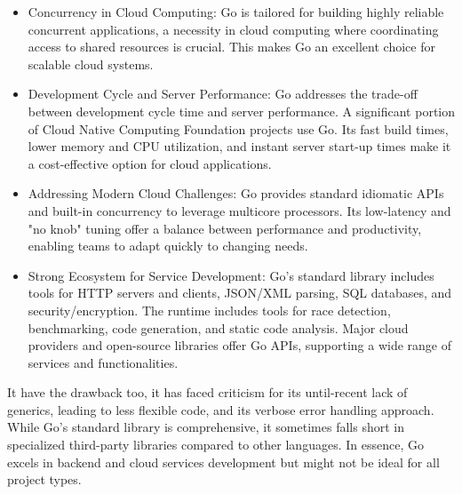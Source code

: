 \begin{itemize}
    \item Concurrency in Cloud Computing: Go is tailored for building highly reliable concurrent
          applications, a necessity in cloud computing where coordinating access to shared resources is
          crucial. This makes Go an excellent choice for scalable cloud systems.
    \item Development Cycle and Server Performance: Go addresses the trade-off between development
          cycle time and server performance. A significant portion of Cloud Native Computing Foundation
          projects use Go. Its fast build times, lower memory and CPU utilization, and instant server
          start-up times make it a cost-effective option for cloud applications.
    \item Addressing Modern Cloud Challenges: Go provides standard idiomatic APIs and built-in
          concurrency to leverage multicore processors. Its low-latency and "no knob" tuning offer a
          balance between performance and productivity, enabling teams to adapt quickly to changing needs.
    \item Strong Ecosystem for Service Development: Go's standard library includes tools for HTTP
          servers and clients, JSON/XML parsing, SQL databases, and security/encryption. The runtime
          includes tools for race detection, benchmarking, code generation, and static code analysis.
          Major cloud providers and open-source libraries offer Go APIs, supporting a wide range of
          services and functionalities.
\end{itemize}

It have the drawback too, it has faced criticism for its until-recent lack of generics, leading to
less flexible code, and its verbose error handling approach. While Go's standard library is
comprehensive, it sometimes falls short in specialized third-party libraries compared to other
languages. In essence, Go excels in backend and cloud services development but might not be ideal
for all project types.

